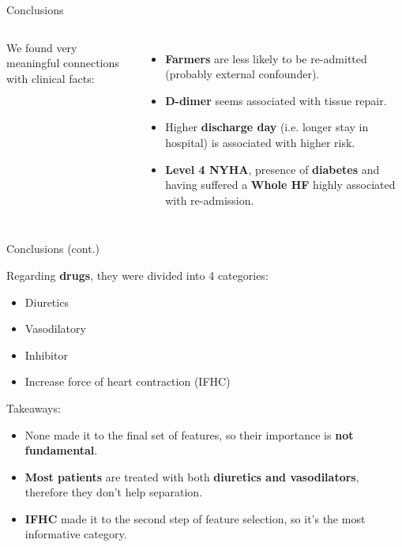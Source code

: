 \documentclass[aspectratio=169,xcolor=dvipsnames]{beamer}
\begin{document}
\begin{frame}{Conclusions}
\begin{columns}[c]
        We found very meaningful connections with clinical facts:
        \begin{itemize}
            \item \textbf{Farmers} are less likely to be re-admitted (probably external confounder).
            \item \textbf{D-dimer} seems associated with tissue repair.
            \item Higher \textbf{discharge day} (i.e. longer stay in hospital) is associated with higher risk.
            \item \textbf{Level 4 NYHA}, presence of \textbf{diabetes} and having suffered a \textbf{Whole HF} highly associated with re-admission.
        \end{itemize}
    \end{columns}
    
\end{frame}

\begin{frame}{Conclusions (cont.)}

    Regarding \textbf{drugs}, they were divided into 4 categories:
    \begin{itemize}
        \item Diuretics
        \item Vasodilatory
        \item Inhibitor
        \item Increase force of heart contraction (IFHC)
    \end{itemize}
    \pause
    Takeaways:
    \begin{itemize}
        \item None made it to the final set of features, so their importance is \textbf{not fundamental}.
        \pause
        \item \textbf{Most patients} are treated with both \textbf{diuretics and vasodilators}, therefore they don't help separation.
        \pause
        \item \textbf{IFHC} made it to the second step of feature selection, so it's the most informative category.
    \end{itemize}

\end{frame}
\end{document}
